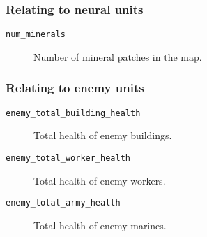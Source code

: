 \subsubsection*{Relating to neural units}
\begin{description}
    \item[\texttt{num\_minerals}] Number of mineral patches in the map.
\end{description}

\subsubsection*{Relating to enemy units}
\begin{description}
    \item[\texttt{enemy\_total\_building\_health}] Total health of enemy buildings.
    \item[\texttt{enemy\_total\_worker\_health}] Total health of enemy workers.
    \item[\texttt{enemy\_total\_army\_health}] Total health of enemy marines.
\end{description}